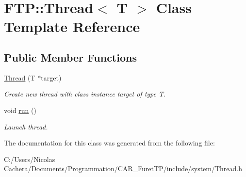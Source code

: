 \hypertarget{classFTP_1_1Thread}{}\section{F\+T\+P\+:\+:Thread$<$ T $>$ Class Template Reference}
\label{classFTP_1_1Thread}
\subsection*{Public Member Functions}
\begin{DoxyCompactItemize}
\item 
\hypertarget{classFTP_1_1Thread_a05e8388a05898b5e12ad102686bc370f}{}\hyperlink{classFTP_1_1Thread_a05e8388a05898b5e12ad102686bc370f}{Thread} (T $\ast$target)\label{classFTP_1_1Thread_a05e8388a05898b5e12ad102686bc370f}

\begin{DoxyCompactList}\small\item\em Create new thread with class instance target of type T. \end{DoxyCompactList}\item 
\hypertarget{classFTP_1_1Thread_adb6eb9864223b888a2d20e7349e0d57a}{}void \hyperlink{classFTP_1_1Thread_adb6eb9864223b888a2d20e7349e0d57a}{run} ()\label{classFTP_1_1Thread_adb6eb9864223b888a2d20e7349e0d57a}

\begin{DoxyCompactList}\small\item\em Launch thread. \end{DoxyCompactList}\end{DoxyCompactItemize}


The documentation for this class was generated from the following file\+:\begin{DoxyCompactItemize}
\item 
C\+:/\+Users/\+Nicolas Cachera/\+Documents/\+Programmation/\+C\+A\+R\+\_\+\+Furet\+T\+P/include/system/Thread.\+h\end{DoxyCompactItemize}

